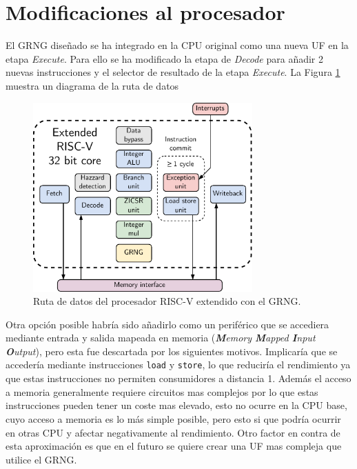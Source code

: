 \section{Modificaciones al procesador}

El GRNG diseñado se ha integrado en la CPU original como una nueva UF en la etapa \textit{Execute}. Para ello se ha modificado la etapa de \textit{Decode} para añadir 2 nuevas instrucciones y el selector de resultado de la etapa \textit{Execute}. La Figura \ref{fig:extended_riscv_core} muestra un diagrama de la ruta de datos 

\begin{figure}[h]
    \centering
    \includegraphics[width=0.75\textwidth]{root/Imagenes/5_riscv/extended_core.pdf}
    \caption{Ruta de datos del procesador RISC-V extendido con el GRNG.}
    \label{fig:extended_riscv_core}
\end{figure}

Otra opción posible habría sido añadirlo como un periférico que se accediera mediante entrada y salida mapeada en memoria (\textit{\textbf{M}emory \textbf{M}apped \textbf{I}nput \textbf{O}utput}), pero esta fue descartada por los siguientes motivos. Implicaría que se accedería mediante instrucciones \texttt{load} y \texttt{store}, lo que reduciría el rendimiento ya que estas instrucciones no permiten consumidores a distancia 1. Además el acceso a memoria generalmente requiere circuitos mas complejos por lo que estas instrucciones pueden tener un coste mas elevado, esto no ocurre en la CPU base, cuyo acceso a memoria es lo más simple posible, pero esto si que podría ocurrir en otras CPU y afectar negativamente al rendimiento. Otro factor en contra de esta aproximación es que en el futuro se quiere crear una UF mas compleja que utilice el GRNG.


